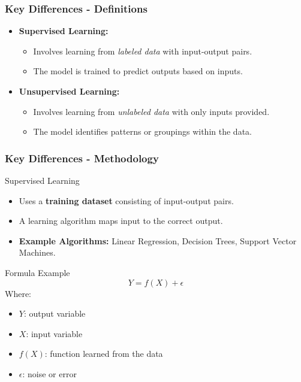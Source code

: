 \documentclass[aspectratio=169]{beamer}
\begin{document}
\begin{frame}[fragile]
    \frametitle{Key Differences - Definitions}
    \begin{itemize}
        \item \textbf{Supervised Learning:} 
        \begin{itemize}
            \item Involves learning from \textit{labeled data} with input-output pairs.
            \item The model is trained to predict outputs based on inputs.
        \end{itemize}
        \item \textbf{Unsupervised Learning:} 
        \begin{itemize}
            \item Involves learning from \textit{unlabeled data} with only inputs provided.
            \item The model identifies patterns or groupings within the data.
        \end{itemize}
    \end{itemize}
\end{frame}

\begin{frame}[fragile]
    \frametitle{Key Differences - Methodology}
    \begin{block}{Supervised Learning}
    \begin{itemize}
        \item Uses a \textbf{training dataset} consisting of input-output pairs.
        \item A learning algorithm maps input to the correct output.
        \item \textbf{Example Algorithms:} Linear Regression, Decision Trees, Support Vector Machines.
    \end{itemize}
    \end{block}

    \begin{block}{Formula Example}
    \begin{equation}
        Y = f(X) + \epsilon
    \end{equation}
    Where:
    \begin{itemize}
        \item \( Y \): output variable
        \item \( X \): input variable
        \item \( f(X) \): function learned from the data
        \item \( \epsilon \): noise or error
    \end{itemize}
    \end{block}
\end{frame}
\end{document}
